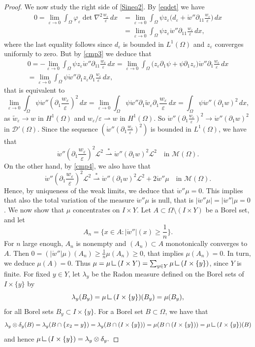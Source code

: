 \documentclass[a4, 11pt, reqno, final]{amsart}
\newcommand{\mres}{\mathbin{\vrule height 1.6ex depth 0pt width
		0.13ex\vrule height 0.13ex depth 0pt width 1.3ex}}
\newcommand{\calD}{\mathcal{D}}
\newcommand{\calL}{\mathcal{L}}
\newcommand{\calM}{\mathcal{M}}
\newcommand\e{\varepsilon}
\newcommand\weakstar{\stackrel{\ast }{\rightharpoonup}}  %
\newcommand\weak{\rightharpoonup} %
\theoremstyle{plain}%
\newcommand{\QED}{\hspace{1ex}\hfill$\blacksquare$\vspace{2ex}}
\begin{document}
\begin{proof}
		We now study the right side of \eqref{Sineq2}. By \eqref{eqdet}
		we have
		\begin{align*}
			0=\lim_{\e\to 0}\int_\Omega\varphi_\e \det \nabla^2\frac{w_\e}{\e}\,dx&=\lim_{\e\to 0}\int_\Omega\psi z_\e \big(d_\e+  \mathring{w}''\partial_{11}\frac{w_\e}{\e}\big)\,dx\\&=\lim_{\e\to 0}\int_\Omega\psi z_\e   \mathring{w}''\partial_{11}\frac{w_\e}{\e}\,dx,
		\end{align*}
		where the last equality follows since $d_\e$ is bounded in $L^1(\Omega)$ and $z_\e$ converges uniformly to zero.
		But by \eqref{cmp3} we deduce that
		\begin{multline}
			0=-\lim_{\e\to 0}\int_\Omega\psi z_\e   \mathring{w}''\partial_{11}\frac{w_\e}{\e}\,dx=\lim_{\e\to 0}\int_\Omega\big(z_\e\partial_{1}\psi    +\psi\partial_1z_\e\big)\mathring{w}''\partial_{1}\frac{w_\e}{\e}\,dx \\
			=
			\lim_{\e\to 0}\int_\Omega\psi\mathring{w}''\partial_1z_\e\partial_{1}\frac{w_\e}{\e}\,dx,
		\end{multline}
		that is equivalent to
		$$
		\lim_{\e\to 0}\int_\Omega\psi\mathring{w}''(\partial_1\frac{w_\e}{\e})^2\,dx
		=
		\lim_{\e\to 0}\int_\Omega\psi\mathring{w}''\partial_1\tilde w_\e\partial_{1}\frac{w_\e}{\e}\,dx=\int_\Omega\psi\mathring{w}''(\partial_{1}w)^2\,dx,
		$$
		as $\tilde w_\e\to w$ in $H^1(\Omega)$ and $w_\e/\e\weak w$ in $H^1(\Omega)$.
		So $\mathring{w}''(\partial_1\frac{w_\e}{\e})^2 \to \mathring{w}''(\partial_1 w)^2$ in $\calD'(\Omega)$.
		Since the sequence $(\mathring{w}''(\partial_1\frac{w_\e}{\e})^2)$ is bounded in $L^1(\Omega)$, we have that
		$$\mathring{w}''(\partial_1 \frac{w_\e}{\e})^2 \calL^2 \weakstar \mathring{w}''(\partial_1 w)^2\calL^2  \quad \mbox{in } \calM(\Omega).
		$$
		On the other hand, by \eqref{cmp4}, we also have that
		$$\mathring{w}''(\partial_1 \frac{w_\e}{\e})^2 \calL^2 \weakstar \mathring{w}''(\partial_1 w)^2\calL^2 + 2\mathring{w}''\mu \quad \mbox{in } \calM(\Omega).
		$$
		Hence, by uniqueness of the weak limits, we deduce that $\mathring{w}''\mu=0$.
		This implies that also the total variation of the measure $\mathring{w}''\mu$ is null, that is
		$|\mathring{w}''\mu|=|\mathring{w}''|\mu=0$. We now show that $\mu$ concentrates on $I\times Y$.
		Let $A\subset \Omega\setminus (I\times Y)$ be a Borel set, and let
		$$A_n=\{x\in A:|\mathring{w}''|(x)\ge \frac 1n\}.
		$$
		For $n$ large enough, $A_n$ is nonempty and $(A_n)\subset A$ monotonically converges to $A$. Then $0=
		(|\mathring{w}''|\mu)(A_n)\ge \frac1n\mu(A_n)\ge 0$, that implies  $\mu(A_n)=0$. In turn, we deduce $\mu(A)=0$.  Thus $\mu=\mu\mres (I\times Y)=\sum_{y\in Y} \mu\mres (I\times\{y\})$, since $Y$ is finite.
		For fixed $y\in Y$, let $\lambda_y$ be the Radon measure defined on the Borel sets of $I\times\{y\}$ by
		$$\lambda_y(B_y)=\mu\mres (I\times\{y\})(B_y)=\mu(B_y),
		$$
		for all Borel sets $B_y\subset I\times\{y\}$. For a Borel set $B\subset \Omega$, we have that
		$$\lambda_y\otimes\delta_y(B)=\lambda_y(B\cap \{x_2=y\})=\lambda_y(B\cap( I\times\{y\}))=\mu(B\cap( I\times\{y\}))=\mu\mres (I\times\{y\})(B)
		$$
		and hence $\mu\mres (I\times\{y\})=\lambda_y\otimes\delta_y.$
	\end{proof}
\end{document}
